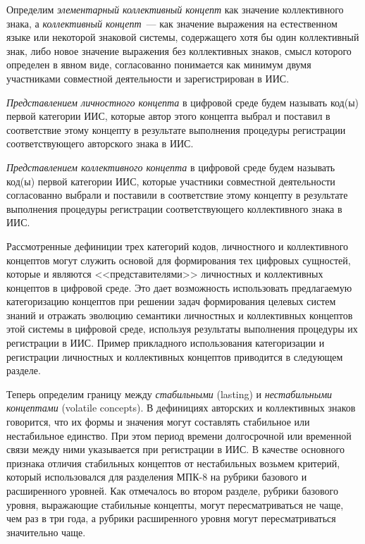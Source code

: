 \begin{multicols}{2}
   Определим \textit{элементарный коллективный концепт} как значение коллективного
знака, а \textit{коллективный концепт}~--- как значение выражения на естественном языке
или некоторой знаковой сис\-те\-мы, содержащего хотя бы один коллективный знак, либо новое
значение выражения без коллективных знаков, смысл которого определен в явном виде,
согласованно понимается как минимум двумя участниками совместной деятельности и
зарегистрирован в ИИС.

   \textit{Представлением личностного концепта} в циф\-ро\-вой среде будем называть код(ы)
первой категории ИИС, которые автор этого концепта выбрал и поставил в соответствие
этому концепту в результате выполнения процедуры регистрации соответствующего
авторского знака в ИИС.

   \textit{Представлением коллективного концепта} в циф\-ро\-вой среде будем называть
код(ы) первой категории ИИС, которые участники совместной дея\-тельности согласованно
выбрали и поставили в %
соот\-вет\-ст\-вие этому концепту в результате выполнения процедуры
регистрации соответствующего коллективного знака в ИИС.

   Рассмотренные дефиниции трех категорий кодов, личностного и коллективного
концептов могут служить основой для формирования тех циф\-ро\-вых сущностей, которые и
являются <<представителями>> личностных и коллективных концептов в циф\-ро\-вой среде.
Это дает возможность использовать предлагаемую категоризацию концептов при решении
задач формирования целевых систем знаний и отражать эволюцию семантики личностных и
коллективных концептов этой системы в цифровой среде, используя результаты выполнения
процедуры их регистрации в ИИС. Пример прикладного использования категоризации и
регистрации личностных и коллективных концептов приводится в следующем разделе.

   Теперь определим границу между \textit{стабильными} (lasting) и
\textit{нестабильными концептами} (volatile concepts). В дефинициях авторских и
коллективных знаков говорится, что их формы и значения могут составлять стабильное или
нестабильное единство. При этом период времени долгосрочной или временной связи между
ними указывается при регистрации в ИИС. В качестве основного признака отличия
стабильных концептов от нестабильных возьмем критерий, который использовался для
разделения МПК-8 на рубрики базового и расширенного уровней. Как отмечалось во втором
разделе, рубрики базового уровня, выражающие стабильные концепты, могут
пересматриваться не чаще, чем раз в три года, а рубрики расширенного уровня могут
пересматриваться значительно чаще.


\end{multicols}
